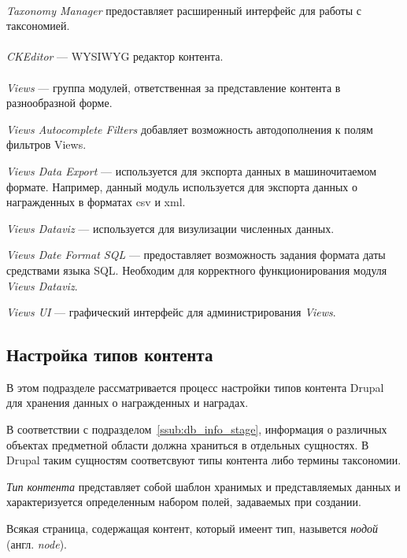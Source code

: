 \paragraph{}
\textit{Taxonomy Manager} предоставляет расширенный интерфейс для работы с таксономией.

\paragraph{}
\textit{CKEditor} --- WYSIWYG редактор контента.

\paragraph{}
\textit{Views} --- группа модулей, ответственная за представление контента
в разнообразной форме.

\textit{Views Autocomplete Filters} добавляет возможность автодополнения
к полям фильтров Views.

\textit{Views Data Export} --- используется для экспорта данных в машиночитаемом формате.
Например, данный модуль используется для экспорта данных о награжденных в форматах csv и xml.

\textit{Views Dataviz} --- используется для визулизации численных данных.

\textit{Views Date Format SQL} --- предоставляет возможность задания формата даты средствами
языка SQL. Необходим для корректного функционирования модуля \textit{Views Dataviz}.

\textit{Views UI} --- графический интерфейс для администрирования \textit{Views}.

\subsection{Настройка типов контента}
\label{ssec:content_types_setup}

В этом подразделе рассматривается процесс настройки типов контента Drupal для хранения
данных о награжденных и наградах.

В соответствии с подразделом~\ref{ssub:db_info_stage}, информация о различных 
объектах предметной области должна храниться в отдельных сущностях.
В Drupal таким сущностям соответсвуют типы контента либо термины таксономии.

\textit{Тип контента} представляет собой шаблон хранимых и представляемых данных и
характеризуется определенным набором полей, задаваемых при создании.

Всякая страница, содержащая контент, который имеент тип,
назывется \textit{нодой} (англ. \textit{node}).

